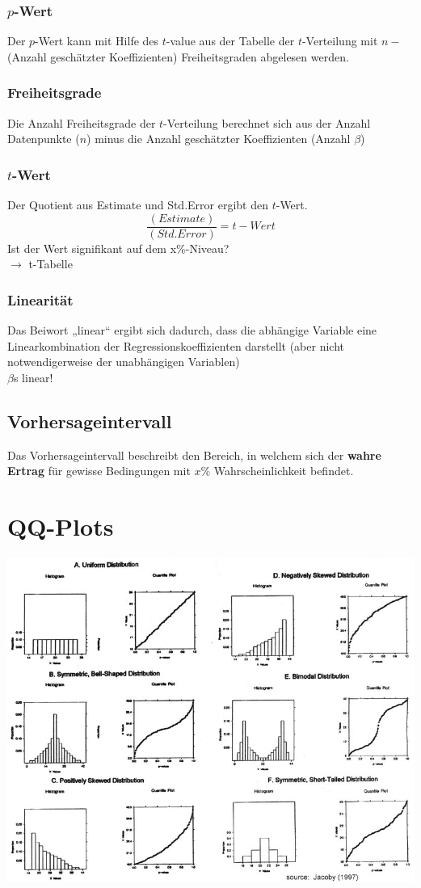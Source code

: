 \documentclass{article}
\begin{document}
\begin{multicols*}{3}
  \subsubsection{$p$-Wert}
  Der $p$-Wert kann mit Hilfe des $t$-value aus der Tabelle der $t$-Verteilung mit $n-$(Anzahl geschätzter Koeffizienten)  Freiheitsgraden abgelesen werden.
  \subsubsection{Freiheitsgrade}
  Die Anzahl Freiheitsgrade der $t$-Verteilung berechnet sich aus der Anzahl Datenpunkte ($n$) minus die Anzahl geschätzter Koeffizienten (Anzahl $\beta$)
  \subsubsection{$t$-Wert}
  Der Quotient aus Estimate und Std.Error ergibt den $t$-Wert.
  $$\frac{(Estimate)}{(Std.Error)}=t-Wert$$
  Ist der Wert signifikant auf dem x\%-Niveau?\\
  $\rightarrow$ t-Tabelle
  \subsubsection{Linearität}
  Das Beiwort „linear“ ergibt sich dadurch,
  dass die abhängige Variable eine Linearkombination
  der Regressionskoeffizienten darstellt (aber nicht notwendigerweise der unabhängigen Variablen)
  \\$\beta$s linear!

  \subsection{Vorhersageintervall}
  Das Vorhersageintervall beschreibt den Bereich, in welchem sich der \textbf{wahre Ertrag} für
  gewisse Bedingungen mit $x \%$ Wahrscheinlichkeit befindet.

  \section{QQ-Plots}

  \includegraphics[scale=0.28, angle=0]{qqplots}


\end{multicols*}
\end{document}
